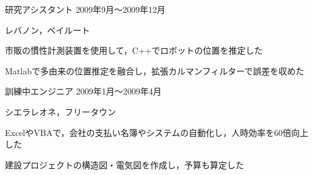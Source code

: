 \documentclass[10pt, a4paper]{article}
\begin{document}
\begin{outerlist}
\item[\href{http://www.aub.edu.lb/fea/me/research_labs/cvl/Pages/home.aspx}{\parbox[t]{3cm}{\raggedleft ベイルート・\\アメリカン大学\\移動ロボット研究室}}]{研究アシスタント} \hfill {2009年9月〜2009年12月}

\vspace{-2\baselineskip}
\hfill レバノン，ベイルート
  \begin{innerlist}
  \item 市販の慣性計測装置を使用して，C++でロボットの位置を推定した
  \item Matlabで多由来の位置推定を融合し，拡張カルマンフィルターで誤差を収めた
  \end{innerlist}

\item[{\parbox[t]{3cm}{\raggedleft Sierra Construction Systems有限会社}}]{訓練中エンジニア} \hfill {2009年1月〜2009年4月}

\vspace{-\baselineskip}
\hfill シエラレオネ，フリータウン
  \begin{innerlist}
  \item ExcelやVBAで，会社の支払い名簿やシステムの自動化し，人時効率を60倍向上した
  \item 建設プロジェクトの構造図・電気図を作成し，予算も算定した
  \end{innerlist}

\end{outerlist}

\end{document}
